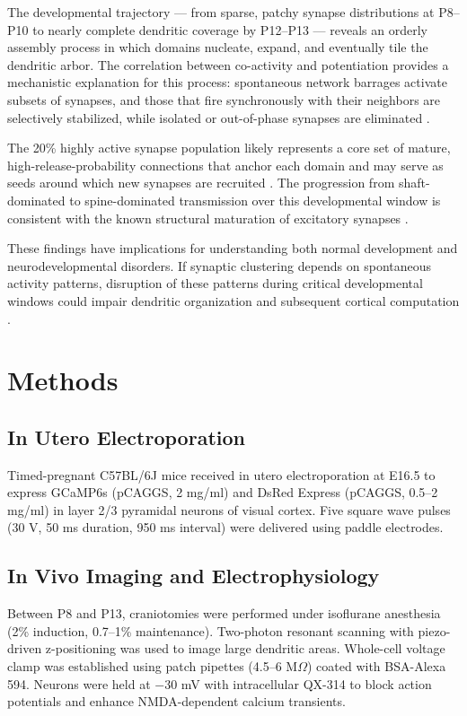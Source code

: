 \documentclass[11pt]{article}
\begin{document}
The developmental trajectory --- from sparse, patchy synapse distributions at P8--P10 to nearly complete dendritic coverage by P12--P13 --- reveals an orderly assembly process in which domains nucleate, expand, and eventually tile the dendritic arbor. The correlation between co-activity and potentiation provides a mechanistic explanation for this process: spontaneous network barrages activate subsets of synapses, and those that fire synchronously with their neighbors are selectively stabilized, while isolated or out-of-phase synapses are eliminated \citep{winnubst2015spontaneous, makino2011compartmentalized}.

The 20\% highly active synapse population likely represents a core set of mature, high-release-probability connections that anchor each domain and may serve as seeds around which new synapses are recruited \citep{park2016bdnf}. The progression from shaft-dominated to spine-dominated transmission over this developmental window is consistent with the known structural maturation of excitatory synapses \citep{blue1983genesis}.

These findings have implications for understanding both normal development and neurodevelopmental disorders. If synaptic clustering depends on spontaneous activity patterns, disruption of these patterns during critical developmental windows could impair dendritic organization and subsequent cortical computation \citep{desai2002critical, rochefort2009sparsification}.

\section{Methods}

\subsection{In Utero Electroporation}

Timed-pregnant C57BL/6J mice received in utero electroporation at E16.5 to express GCaMP6s (pCAGGS, 2 mg/ml) and DsRed Express (pCAGGS, 0.5--2 mg/ml) in layer 2/3 pyramidal neurons of visual cortex. Five square wave pulses (30 V, 50 ms duration, 950 ms interval) were delivered using paddle electrodes.

\subsection{In Vivo Imaging and Electrophysiology}

Between P8 and P13, craniotomies were performed under isoflurane anesthesia (2\% induction, 0.7--1\% maintenance). Two-photon resonant scanning with piezo-driven z-positioning was used to image large dendritic areas. Whole-cell voltage clamp was established using patch pipettes (4.5--6 M$\Omega$) coated with BSA-Alexa 594. Neurons were held at $-30$ mV with intracellular QX-314 to block action potentials and enhance NMDA-dependent calcium transients.
\end{document}
